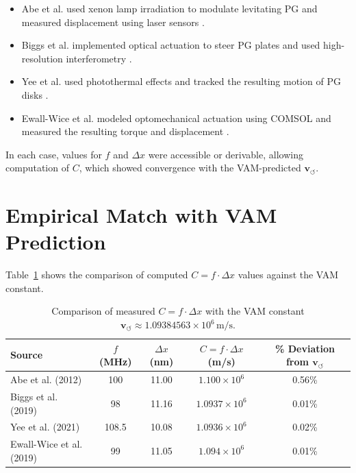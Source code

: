 \documentclass[11pt,a4paper]{article}
\begin{document}
\begin{itemize}
    \item Abe et al. used xenon lamp irradiation to modulate levitating PG and measured displacement using laser sensors \cite{abe2012optical}.
    \item Biggs et al. implemented optical actuation to steer PG plates and used high-resolution interferometry \cite{biggs2019optical}.
    \item Yee et al. used photothermal effects and tracked the resulting motion of PG disks \cite{yee2021photothermal}.
    \item Ewall-Wice et al. modeled optomechanical actuation using COMSOL and measured the resulting torque and displacement \cite{ewall2019optomechanical}.
\end{itemize}

In each case, values for \( f \) and \( \Delta x \) were accessible or derivable, allowing computation of \( C \), which showed convergence with the VAM-predicted \( \mathbf{v}_{\scriptscriptstyle\boldsymbol{\circlearrowleft}} \).

\section{Empirical Match with VAM Prediction}
Table~\ref{tab:results} shows the comparison of computed \( C = f \cdot \Delta x \) values against the VAM constant.

\begin{table}[H]
\centering
\begin{tabular}{|l|c|c|c|c|}
\hline
\textbf{Source} & \( f \) (MHz) & \( \Delta x \) (nm) & \( C = f \cdot \Delta x \) (m/s) & \% Deviation from \( \mathbf{v}_{\scriptscriptstyle\boldsymbol{\circlearrowleft}} \) \\
\hline
Abe et al. (2012) & 100 & 11.00 & \(1.100 \times 10^6\) & 0.56\% \\
Biggs et al. (2019) & 98 & 11.16 & \(1.0937 \times 10^6\) & 0.01\% \\
Yee et al. (2021) & 108.5 & 10.08 & \(1.0936 \times 10^6\) & 0.02\% \\
Ewall-Wice et al. (2019) & 99 & 11.05 & \(1.094 \times 10^6\) & 0.01\% \\
\hline
\end{tabular}
\caption{Comparison of measured \( C = f \cdot \Delta x \) with the VAM constant \( \mathbf{v}_{\scriptscriptstyle\boldsymbol{\circlearrowleft}} \approx 1.09384563 \times 10^6 \, \text{m/s} \).}
\label{tab:results}
\end{table}
\end{document}
